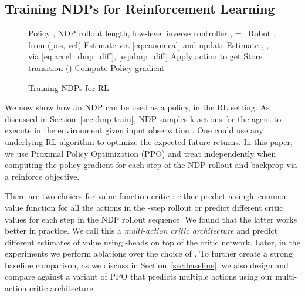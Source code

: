 \documentclass{article}
\newcommand{\our}{NDP\xspace}
\begin{document}
\subsection{Training NDPs for Reinforcement Learning}
\label{sec:dmp-rl}
\begin{wrapfigure}{r}{0.4\textwidth}
\vspace{-14mm}
\begin{minipage}{0.475\textwidth}
\begin{algorithm}[H]
   	\footnotesize
   	\caption{Training NDPs for RL}
   	\begin{algorithmic}
    \REQUIRE Policy ,  NDP rollout length,  low-level inverse controller
            \STATE ,  =  \
            \STATE Robot ,  from  (pos, vel)
                \STATE Estimate  via \eqref{eq:canonical} and update 
                \STATE Estimate , ,  via \eqref{eq:accel_dmp_diff},  \eqref{eq:dmp_diff}
                \STATE 
                \STATE Apply action  to get 
                \STATE Store transition ()
            \ENDFOR
        \STATE Compute Policy gradient 
        \STATE 
        \ENDFOR
    \ENDFOR
   	\end{algorithmic}
   	\label{summary}
\end{algorithm}
\end{minipage}
\vspace{-5mm}
\end{wrapfigure}
We now show how an \our can be used as a policy,  in the RL setting. As discussed in Section~\ref{sec:dmp-train}, \our samples k actions for the agent to execute in the environment given input observation . One could use any underlying RL algorithm to optimize the expected future returns. In this paper, we use Proximal Policy Optimization (PPO) \cite{ppo} and treat  independently when computing the policy gradient for each step of the \our rollout and backprop via a reinforce objective.

There are two choices for value function critic : either predict a single common value function for all the actions in the -step rollout or predict different critic values for each step in the \our rollout sequence. We found that the latter works better in practice. We call this a \textit{multi-action critic architecture} and predict  different estimates of value using -heads on top of the critic network. Later, in the experiments we perform ablations over the choice of . To further create a strong baseline comparison, as we discuss in Section~\ref{sec:baseline}, we also design and compare against a variant of PPO that predicts multiple actions using our multi-action critic architecture.
\end{document}
